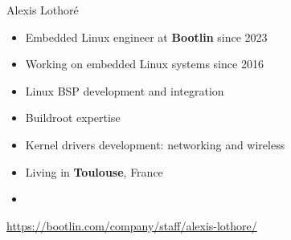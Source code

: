 \begin{frame}{Alexis Lothoré}
  \begin{itemize}
  \item Embedded Linux engineer at {\bf Bootlin} since 2023
  \item Working on embedded Linux systems since 2016
  \item Linux BSP development and integration
  \item Buildroot expertise
  \item Kernel drivers development: networking and wireless
  \item Living in {\bf Toulouse}, France
  \item {}
  \end{itemize}
  {\small \url{https://bootlin.com/company/staff/alexis-lothore/}}
\end{frame}

